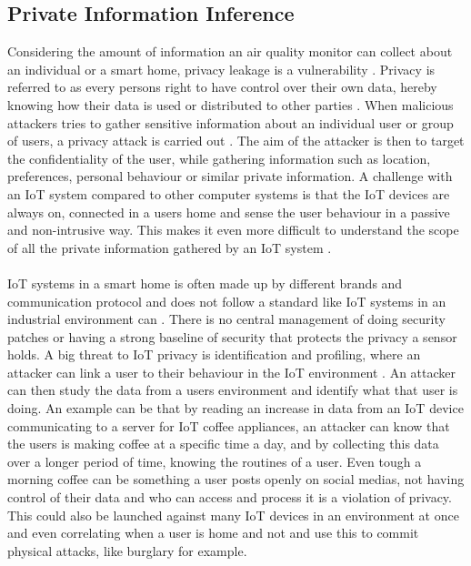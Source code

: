 \subsection{Private Information Inference}
Considering the amount of information an air quality monitor can collect about an individual or a smart home, privacy leakage is a vulnerability \cite{SecPrivSmartCity}. Privacy is referred to as every persons right to have control over their own data, hereby knowing how their data is used or distributed to other parties \cite{IoTSecPrivSafeEth}. When malicious attackers tries to gather sensitive information about an individual user or group of users, a privacy attack is carried out \cite{CyberEntitySecInIoT}. The aim of the attacker is then to target the confidentiality of the user, while gathering information such as location, preferences, personal behaviour or similar private information. A challenge with an IoT system compared to other computer systems is that the IoT devices are always on, connected in a users home and sense the user behaviour in a passive and non-intrusive way. This makes it even more difficult to understand the scope of all the private information gathered by an IoT system \cite{IoTSecPrivSafeEth}.
\\\\
IoT systems in a smart home is often made up by different brands and communication protocol and does not follow a standard like IoT systems in an industrial environment can \cite{IoTPrivSecSmarthome}. There is no central management of doing security patches or having a strong baseline of security that protects the privacy a sensor holds. A big threat to IoT privacy is identification and profiling, where an attacker can link a user to their behaviour in the IoT environment \cite{IoTSecPrivSafeEth}. An attacker can then study the data from a users environment and identify what that user is doing. An example can be that by reading an increase in data from an IoT device communicating to a server for IoT coffee appliances, an attacker can know that the users is making coffee at a specific time a day, and by collecting this data over a longer period of time, knowing the routines of a user. Even tough a morning coffee can be something a user posts openly on social medias, not having control of their data and who can access and process it is a violation of privacy. This could also be launched against many IoT devices in an environment at once and even correlating when a user is home and not and use this to commit physical attacks, like burglary for example. 
\\\\
